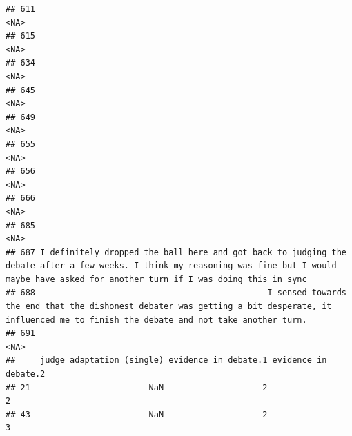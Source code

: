 \documentclass[
]{article}
\begin{document}
\begin{verbatim}
## 611                                                                                                                                                                                             <NA>
## 615                                                                                                                                                                                             <NA>
## 634                                                                                                                                                                                             <NA>
## 645                                                                                                                                                                                             <NA>
## 649                                                                                                                                                                                             <NA>
## 655                                                                                                                                                                                             <NA>
## 656                                                                                                                                                                                             <NA>
## 666                                                                                                                                                                                             <NA>
## 685                                                                                                                                                                                             <NA>
## 687 I definitely dropped the ball here and got back to judging the debate after a few weeks. I think my reasoning was fine but I would maybe have asked for another turn if I was doing this in sync
## 688                                               I sensed towards the end that the dishonest debater was getting a bit desperate, it influenced me to finish the debate and not take another turn. 
## 691                                                                                                                                                                                             <NA>
##     judge adaptation (single) evidence in debate.1 evidence in debate.2
## 21                        NaN                    2                    2
## 43                        NaN                    2                    3

\end{verbatim}
\end{document}
